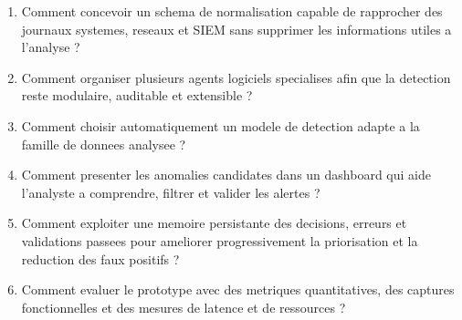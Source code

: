 \begin{enumerate}
  \item Comment concevoir un schema de normalisation capable de rapprocher des journaux systemes, reseaux et SIEM sans supprimer les informations utiles a l'analyse ?
  \item Comment organiser plusieurs agents logiciels specialises afin que la detection reste modulaire, auditable et extensible ?
  \item Comment choisir automatiquement un modele de detection adapte a la famille de donnees analysee ?
  \item Comment presenter les anomalies candidates dans un dashboard qui aide l'analyste a comprendre, filtrer et valider les alertes ?
  \item Comment exploiter une memoire persistante des decisions, erreurs et validations passees pour ameliorer progressivement la priorisation et la reduction des faux positifs ?
  \item Comment evaluer le prototype avec des metriques quantitatives, des captures fonctionnelles et des mesures de latence et de ressources ?
\end{enumerate}

